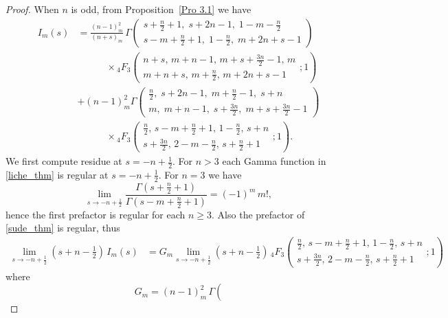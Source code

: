 \documentclass[10pt,a4paper]{amsart}
\begin{document}
\begin{proof}
        When $n$ is odd, from Proposition~\ref{Pro 3.1} we have
\begin{align} 
I_m(s) &= \frac{(n-1)_m^2}{(n+s)_m}\,
\Gamma\!\left(
\begin{matrix}
s+\frac{n}{2}+1,\; s+2n-1,\; 1-m-\frac{n}{2}
\\
s-m+\frac{n}{2}+1,\; 1-\frac{n}{2},\; m+2n+s-1
\end{matrix}
\right) \label{liche_thm} \\[3pt]
&\qquad \quad \times {}_4F_3 \left( \begin{matrix} n + s, \, m + n - 1, \, m + s + \frac{3n}{2} - 1, \, m \\ m + n + s, \, m + \frac{n}{2}, \, m + 2n + s - 1 \end{matrix} ; 1 \right) \nonumber \\[1em]
& + (n-1)_m^2  \Gamma\!\left(
\begin{matrix}
\frac{n}{2},\; s+2n-1,\; m+\frac{n}{2}-1,\; s+n
\\
m,\; m+n-1,\; s+\frac{3n}{2},\; m+s+\frac{3n}{2}-1
\end{matrix}
\right) \label{sude_thm} \\[3pt]
&\qquad \quad \times {}_4F_3 \left( \begin{matrix} \frac{n}{2}, \, s - m + \frac{n}{2} + 1, \, 1 - \frac{n}{2}, \, s + n \\ s + \frac{3n}{2}, \, 2 - m - \frac{n}{2}, \, s + \frac{n}{2} + 1 \end{matrix} ; 1 \right) \nonumber.
\end{align}
We first compute residue at $s = -n+\frac1 2.$
For $n > 3$ each Gamma function in \eqref{liche_thm} is regular at $s = -n + \frac{1}{2}$. For $n = 3$ we have $$\lim_{s \rightarrow-n+\frac{1}{2}}\frac{\Gamma(s+\frac{n}{2}+1)}{\Gamma(s-m+\frac{n}{2}+1)} = (-1)^m\,m!,$$
hence the first prefactor is regular for each $n \geq 3$.
Also the prefactor of \eqref{sude_thm} is regular, thus 
\begin{align*}
   \lim_{s\rightarrow -n+\frac{1}{2}} (s+n-\frac{1}{2})\,I_m(s) &=  G_m \lim_{s\rightarrow -n+\frac{1}{2}} (s+n-\frac{1}{2})\,{}_4F_3 \left( \begin{matrix} \frac{n}{2}, \, s - m + \frac{n}{2} + 1, \, 1 - \frac{n}{2}, \, s + n \\ s + \frac{3n}{2}, \, 2 - m - \frac{n}{2}, \, s + \frac{n}{2} + 1 \end{matrix} ; 1 \right)
\end{align*}
where 
$$
G_m = (n-1)_m^2\,  \Gamma\!\left(
$$
\end{proof}
\end{document}
